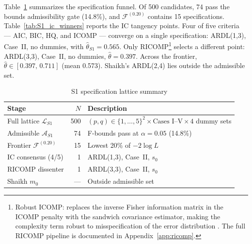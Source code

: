 \documentclass[11pt,a4paper]{article}
\begin{document}
Table~\ref{tab:S1_lattice_stats} summarizes the specification funnel.
Of 500 candidates, 74 pass the bounds admissibility gate (14.8\%), and
$\mathcal{F}^{(0.20)}$ contains 15 specifications.
Table~\ref{tab:S1_ic_winners} reports the IC tangency points. Four of five
criteria --- AIC, BIC, HQ, and ICOMP --- converge on a single
specification: ARDL(1,3), Case~II, no dummies, with
$\hat{\theta}_{S1} = 0.565$. Only
RICOMP\footnote{Robust ICOMP: replaces the inverse Fisher information
matrix in the ICOMP penalty with the sandwich covariance estimator, making
the complexity term robust to misspecification of the error distribution
\citep{GuneyBozdoganArslan2021}. The full RICOMP pipeline is documented in
Appendix~\ref{app:ricomp}.} selects a different point: ARDL(3,3), Case~II,
no dummies, $\hat{\theta} = 0.397$. Across the frontier,
$\hat{\theta} \in [0.397,\, 0.711]$ (mean 0.573). Shaikh's ARDL(2,4)
lies outside the admissible set.

\begin{table}[!ht]
	\centering
	\small
	\caption{S1 specification lattice summary}
	\label{tab:S1_lattice_stats}
	\begin{tabular}{lrl}
		\hline\hline
		Stage & $N$ & Description \\
		\hline
		Full lattice $\mathcal{L}_{S1}$ & 500 &
			$(p,q) \in \{1,\ldots,5\}^2 \times \text{Cases I--V}
			 \times 4$ dummy sets \\
		Admissible $\mathcal{A}_{S1}$ & 74 &
			F-bounds pass at $\alpha = 0.05$ (14.8\%) \\
		Frontier $\mathcal{F}^{(0.20)}$ & 15 &
			Lowest 20\% of $-2\log L$ \\
		IC consensus (4/5) & 1 &
			ARDL(1,3), Case~II, $s_0$ \\
		RICOMP dissenter & 1 &
			ARDL(3,3), Case~II, $s_0$ \\
		Shaikh $m_0$ & --- &
			Outside admissible set \\
		\hline
	\end{tabular}
\end{table}
\end{document}
